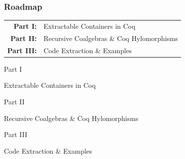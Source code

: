 \begin{frame}
  \frametitle{Roadmap}
  \centering
  \LARGE

    \begin{sticky}%
      \vspace{-1.5em}
      \begin{tabular}{@{}rl}
        {\textbf{\color{gray}Part I:}} & Extractable Containers in Coq \\
        {\textbf{\color{gray}Part II:}} & Recursive Coalgebras \& Coq Hylomorphisms \\
        {\textbf{\color{gray}Part III:}} & Code Extraction \& Examples 
      \end{tabular}
    \end{sticky}
\end{frame}
% 
% 
% 
\begin{frame}
  \vfill
  \centering
  \begin{sticky}
    {\normalfont Part I}

    {\normalfont\Large Extractable Containers in Coq}
    \par%
  \end{sticky}
  \vfill
\end{frame}

\begin{frame}
  \vfill
  \centering
  \begin{sticky}
    {\normalfont Part II}

    {\normalfont\Large Recursive Coalgebras \& Coq Hylomorphisms}
    \par%
  \end{sticky}
  \vfill
\end{frame}

\begin{frame}
  \vfill
  \centering
  \begin{sticky}
    {\normalfont Part III}

    {\normalfont\Large Code Extraction \& Examples}
    \par%
  \end{sticky}
  \vfill
\end{frame}


